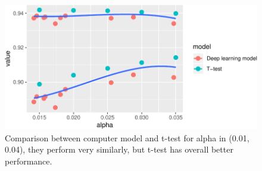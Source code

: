 \documentclass[12pt]{article}
\begin{document}
\begin{figure}

{\centering \includegraphics{pc_plots_files/figure-latex/ttdl-1} 

}

\caption{Comparison between computer model and t-test for alpha in (0.01, 0.04), they perform very similarly, but t-test has overall better performance.}\label{fig:ttdl}
\end{figure}



\end{document}
